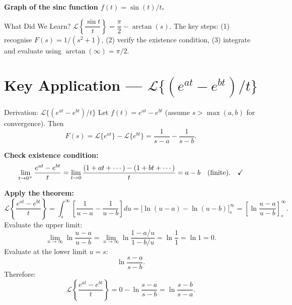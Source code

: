 \documentclass[12pt,a4paper]{article}
\begin{document}
\medskip
\noindent\textbf{Graph of the sinc function $f(t)=\sin(t)/t$.}

\begin{center}
\end{center}

\begin{learnbox}{What Did We Learn?}
$\mathcal{L}\!\left\{\dfrac{\sin t}{t}\right\} = \dfrac{\pi}{2} - \arctan(s)$.
The key steps: (1) recognise $F(s)=1/(s^2+1)$, (2) verify the existence
condition, (3) integrate and evaluate using $\arctan(\infty)=\pi/2$.
\end{learnbox}

\section{Key Application --- \texorpdfstring{$\mathcal{L}\{(e^{at}-e^{bt})/t\}$}{L{(e^at-e^bt)/t}}}

\begin{infobox}{Derivation: $\mathcal{L}\{(e^{at}-e^{bt})/t\}$}
Let $f(t) = e^{at} - e^{bt}$ (assume $s > \max(a,b)$ for convergence). Then
\[
  F(s) = \mathcal{L}\{e^{at}\} - \mathcal{L}\{e^{bt}\}
       = \frac{1}{s-a} - \frac{1}{s-b}.
\]

\textbf{Check existence condition:}
\[
  \lim_{t\to 0^+}\frac{e^{at}-e^{bt}}{t}
  = \lim_{t\to 0}\frac{(1+at+\cdots)-(1+bt+\cdots)}{t}
  = a - b \quad(\text{finite}). \quad\text{\checkmark}
\]

\textbf{Apply the theorem:}
\[
  \mathcal{L}\!\left\{\frac{e^{at}-e^{bt}}{t}\right\}
  = \int_s^\infty \left[\frac{1}{u-a} - \frac{1}{u-b}\right] du
  = \Big[\ln(u-a) - \ln(u-b)\Big]_s^\infty
  = \left[\ln\frac{u-a}{u-b}\right]_s^\infty.
\]
Evaluate the upper limit:
\[
  \lim_{u\to\infty}\ln\frac{u-a}{u-b}
  = \lim_{u\to\infty}\ln\frac{1-a/u}{1-b/u}
  = \ln\frac{1}{1} = \ln 1 = 0.
\]
Evaluate at the lower limit $u = s$:
\[
  \ln\frac{s-a}{s-b}.
\]
Therefore:
\[
  \mathcal{L}\!\left\{\frac{e^{at}-e^{bt}}{t}\right\}
  = 0 - \ln\frac{s-a}{s-b}
  = \ln\frac{s-b}{s-a}.
\]
\end{infobox}
\end{document}
